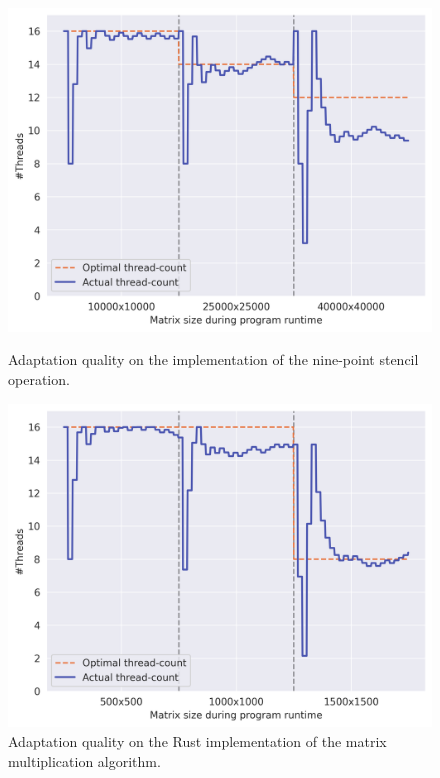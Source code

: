 \begin{figure}[t]
    \centering
    \begin{minipage}[c]{0.49\linewidth}
        \centering
        \captionsetup{width=0.9\linewidth}
        \includegraphics[width=\linewidth]{images/adapt_stencil.png}
        \caption{Adaptation quality on the \sac{} implementation of the nine-point stencil operation.}
        \label{fig:adapt-stencil}
    \end{minipage}%
    \begin{minipage}[c]{0.49\linewidth}
        \centering
        \captionsetup{width=0.9\linewidth}
        \includegraphics[width=\linewidth]{images/adapt_rust.png}
        \caption{Adaptation quality on the Rust implementation of the matrix multiplication algorithm.}
        \label{fig:adapt-rust}
    \end{minipage}%
\end{figure}

